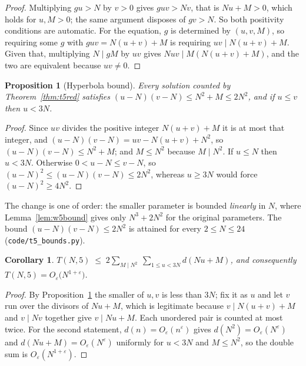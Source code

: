 \documentclass[11pt]{article}
\theoremstyle{plain}
\newtheorem{proposition}[theorem]{Proposition}
\newtheorem{corollary}[theorem]{Corollary}
\theoremstyle{definition}
\begin{document}
\begin{proof}
Multiplying $gu>N$ by $v>0$ gives $guv>Nv$, that is $Nu+M>0$, which holds for $u,M>0$; the
same argument disposes of $gv>N$. So both positivity conditions are automatic. For the
equation, $g$ is determined by $(u,v,M)$, so requiring some $g$ with $guv=N(u+v)+M$ is
requiring $uv\mid N(u+v)+M$. Given that, multiplying $N\mid gM$ by $uv$ gives
$Nuv\mid M(N(u+v)+M)$, and the two are equivalent because $uv\ne0$.
\end{proof}

\begin{proposition}[Hyperbola bound]\label{prop:hyp}
Every solution counted by Theorem~\ref{thm:t5red} satisfies $(u-N)(v-N)\le N^2+M\le 2N^2$,
and if $u\le v$ then $u<3N$.
\end{proposition}

\begin{proof}
Since $uv$ divides the positive integer $N(u+v)+M$ it is at most that integer, and
$(u-N)(v-N)=uv-N(u+v)+N^2$, so $(u-N)(v-N)\le N^2+M$; and $M\le N^2$ because $M\mid N^2$. If
$u\le N$ then $u<3N$. Otherwise $0<u-N\le v-N$, so $(u-N)^2\le(u-N)(v-N)\le 2N^2$, whereas
$u\ge 3N$ would force $(u-N)^2\ge 4N^2$.
\end{proof}

The change is one of order: the smaller parameter is bounded \emph{linearly} in $N$, where
Lemma~\ref{lem:w5bound} gives only $N^3+2N^2$ for the original parameters. The bound
$(u-N)(v-N)\le2N^2$ is attained for every $2\le N\le24$ (\texttt{code/t5\_bounds.py}).

\begin{corollary}\label{cor:t5upper}
$\displaystyle T(N,5)\;\le\;2\sum_{M\mid N^2}\ \sum_{1\le u<3N} d(Nu+M)$, and consequently
$T(N,5)=O_{\varepsilon}\bigl(N^{1+\varepsilon}\bigr)$.
\end{corollary}

\begin{proof}
By Proposition~\ref{prop:hyp} the smaller of $u,v$ is less than $3N$; fix it as $u$ and let
$v$ run over the divisors of $Nu+M$, which is legitimate because $v\mid N(u+v)+M$ and
$v\mid Nv$ together give $v\mid Nu+M$. Each unordered pair is counted at most twice. For the
second statement, $d(n)=O_\varepsilon(n^{\varepsilon})$ gives $d(N^2)=O_\varepsilon(N^{\varepsilon})$
and $d(Nu+M)=O_\varepsilon(N^{\varepsilon})$ uniformly for $u<3N$ and $M\le N^2$, so the double
sum is $O_\varepsilon(N^{1+\varepsilon})$.
\end{proof}
\end{document}
